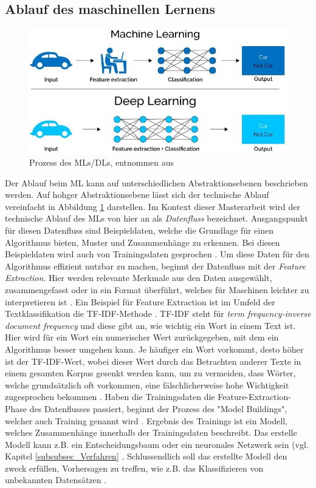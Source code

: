 \subsection{Ablauf des maschinellen Lernens}
\label{subsec_AblaufML}
\begin{figure}
    \centering
    \includegraphics[scale=0.45]{pic/MA-Bilder/MLPipeline.jpeg}
    \caption{Prozess des MLs/DLs, entnommen aus \cite{WolfewiczML}}
    \label{Fig:mlpipeline}
\end{figure}
Der Ablauf beim ML kann auf unterschiedlichen Abstraktionsebenen beschrieben werden. Auf hohger Abstraktionsebene lässt sich der technische Ablauf vereinfacht in Abbildung \ref{Fig:mlpipeline} darstellen. Im Kontext dieser Masterarbeit wird der technische Ablauf des MLs von hier an als \emph{Datenfluss} bezeichnet. Ausgangspunkt für diesen Datenfluss sind Beispieldaten, welche die Grundlage für einen Algorithmus bieten, Muster und Zusammenhänge zu erkennen. Bei diesen Beispieldaten wird auch von Trainingsdaten gesprochen \cite{janiesch2021machine}. Um diese Daten für den Algorithmus effizient nutzbar zu machen, beginnt der Datenfluss mit der \emph{Feature Extraction}. Hier werden relevante Merkmale aus den Daten ausgewählt, zusammengefasst oder in ein Format überführt, welches für Maschinen leichter zu interpretieren ist \cite{janiesch2021machine}. Ein Beispiel für Feature Extraction ist im Umfeld der Textklassifikation die TF-IDF-Methode \cite{dalal2011automatic}. TF-IDF steht für \emph{term frequency-inverse document frequency} und diese gibt an, wie wichtig ein Wort in einem Text ist. Hier wird für ein Wort ein numerischer Wert zurückgegeben, mit dem ein Algorithmus besser umgehen kann. Je häufiger ein Wort vorkommt, desto höher ist der TF-IDF-Wert, wobei dieser Wert durch das Betrachten anderer Texte in einem gesamten Korpus gesenkt werden kann, um zu vermeiden, dass Wörter, welche grundsätzlich oft vorkommen, eine fälschlicherweise hohe Wichtigkeit zugesprochen bekommen \cite{bafna2016document}. Haben die Trainingsdaten die Feature-Extraction-Phase des Datenflusses passiert, beginnt der Prozess des "Model Buildings", welcher auch Training genannt wird \cite{Cady.2017, bacstanlar2014introduction}. Ergebnis des Trainings ist ein Modell, welches Zusammenhänge innerhalb der Trainingsdaten beschreibt. Das erstelle Modell kann z.B. ein Entscheidungsbaum oder ein neuronales Netzwerk sein (vgl. Kapitel \ref{subsubsec_Verfahren} \cite{Cleve.2020}. Schlussendlich soll das erstellte Modell den zweck erfüllen, Vorhersagen zu treffen, wie z.B. das Klassifizieren von unbekannten Datensätzen \cite{Wuttke.2022}. 

